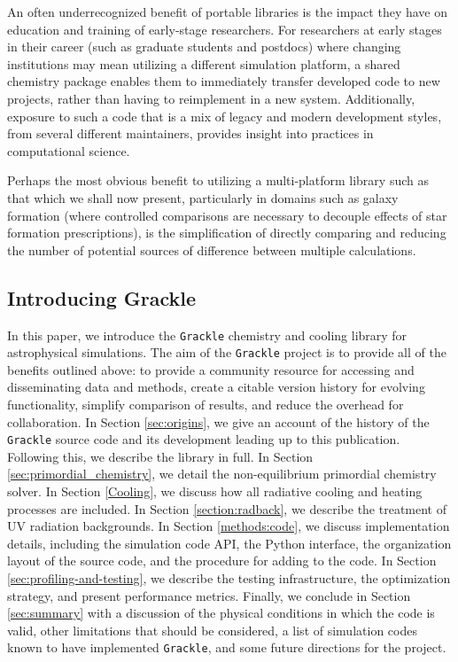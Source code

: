 An often underrecognized benefit of portable libraries
is the impact they have on education and training of early-stage researchers.
For researchers at early stages in their career (such as graduate students and
postdocs) where changing institutions may mean utilizing a different simulation
platform, a shared chemistry package enables them to immediately transfer
developed code to new projects, rather than having to reimplement in a new
system.  Additionally, exposure to such a code that is a mix
of legacy and modern development styles, from several different maintainers,
provides insight into practices in computational science.

Perhaps the most obvious benefit to utilizing a multi-platform library such as
that which we shall now present, particularly in domains such as galaxy formation (where
controlled comparisons are necessary to decouple effects of star formation
prescriptions), is the simplification of directly comparing and reducing the
number of potential sources of difference between multiple calculations.

\subsection{Introducing Grackle}

In this paper, we introduce the \texttt{Grackle} chemistry and cooling
library for astrophysical simulations.  The aim of the
\texttt{Grackle} project is to provide all of the benefits outlined
above: to provide a community resource for accessing and disseminating
data and methods, create a citable version history for evolving
functionality, simplify comparison of results, and reduce the overhead
for collaboration.  In Section \ref{sec:origins}, we give an account
of the history of the \texttt{Grackle} source code and its development
leading up to this publication.  Following this, we describe the
library in full.  In Section \ref{sec:primordial_chemistry}, we detail
the non-equilibrium primordial chemistry solver.  In Section
\ref{Cooling}, we discuss how all radiative cooling and heating
processes are included.  In Section \ref{section:radback}, we describe
the treatment of UV radiation backgrounds.  In Section
\ref{methods:code}, we discuss implementation details, including the
simulation code API, the Python interface, the organization layout of
the source code, and the procedure for adding to the code.  In Section
\ref{sec:profiling-and-testing}, we describe the testing
infrastructure, the optimization strategy, and present performance
metrics.  Finally, we conclude in Section \ref{sec:summary} with a
discussion of the physical conditions in which the code is valid,
other limitations that should be considered, a list of simulation
codes known to have implemented \texttt{Grackle}, and some future
directions for the project.

